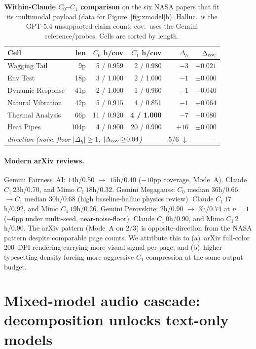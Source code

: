 \documentclass[11pt]{article}
\begin{document}
\begin{table}[h]
\centering
\small
\caption{\textbf{Within-Claude $C_0$--$C_1$ comparison} on the six NASA papers that fit its multimodal payload (data for Figure~\ref{fig:xmodel}b). Halluc.\ is the GPT-5.4 unsupported-claim count; cov.\ uses the Gemini reference/probes. Cells are sorted by length.}
\label{tab:claude_within}
\begin{tabular}{lrrrrr}
\toprule
Cell & len & $C_0$ h/cov & $C_1$ h/cov & $\Delta_h$ & $\Delta_{\rm cov}$ \\
\midrule
Wagging Tail      &   9p & 5 / 0.959  & 2 / 0.980  & $-3$  & $+0.021$ \\
Env Test          &  18p & 3 / 1.000  & 2 / 1.000  & $-1$  & $\pm0.000$ \\
Dynamic Response  &  41p & 2 / 1.000  & 1 / 0.960  & $-1$  & $-0.040$ \\
Natural Vibration &  42p & 5 / 0.915  & 4 / 0.851  & $-1$  & $-0.064$ \\
Thermal Analysis  &  66p & 11 / 0.920 & \textbf{4 / 1.000} & $-7$ & $+0.080$ \\
Heat Pipes        & 104p & \textbf{4} / 0.900 & 20 / 0.900 & $+16$ & $\pm0.000$ \\
\midrule
\multicolumn{4}{l}{\emph{direction (noise floor $|\Delta_h|{\ge}1$, $|\Delta_{\rm cov}|{\ge}0.04$)}} & 5/6 $\downarrow$ & --- \\
\bottomrule
\end{tabular}
\end{table}

\paragraph{Modern arXiv reviews.} Gemini Fairness~AI: $14$h/0.50 $\to$ $15$h/0.40 ($-10$pp coverage, Mode~A). Claude $C_1\,23$h/0.70, and Mimo $C_1\,18$h/0.32. Gemini Megagauss: $C_0$ median $36$h/0.66 $\to C_1$ median $30$h/0.68 (high baseline-halluc physics review). Claude $C_1\,17$h/0.92, and Mimo $C_1\,19$h/0.26. Gemini Perovskite: $2$h/0.90 $\to$ $3$h/0.74 at $n{=}1$ ($-6$pp under multi-seed, near-noise-floor). Claude $C_1\,0$h/0.90, and Mimo $C_1\,2$h/0.90. The arXiv pattern (Mode~A on $2/3$) is opposite-direction from the NASA pattern despite comparable page counts. We attribute this to (a)~arXiv full-color 200~DPI rendering carrying more visual signal per page, and (b)~higher typesetting density forcing more aggressive $C_1$ compression at the same output budget.

\section{Mixed-model audio cascade: decomposition unlocks text-only models}
\label{appdx:mixed}
\end{document}

